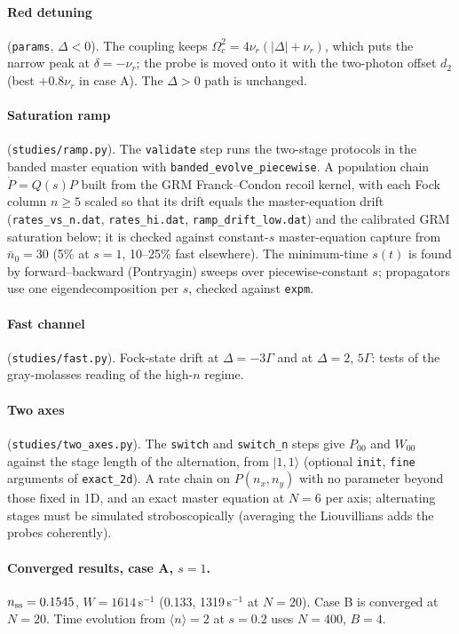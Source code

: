\documentclass[11pt,a4paper]{article}
\newcommand{\ket}[1]{|#1\rangle}
\newcommand{\code}[1]{\texttt{#1}}
\begin{document}
\paragraph{Red detuning} (\code{params}, $\Delta<0$). The coupling keeps $\Omega_c^2=4\nu_r(|\Delta|+\nu_r)$, which puts the narrow peak at $\delta=-\nu_r$; the probe is moved onto it with the two-photon offset $d_2$ (best $+0.8\nu_r$ in case A). The $\Delta>0$ path is unchanged.

\paragraph{Saturation ramp} (\code{studies/ramp.py}). The \code{validate} step runs the two-stage protocols in the banded master equation with \code{banded\_evolve\_piecewise}. A population chain $\dot P=Q(s)P$ built from the GRM Franck--Condon recoil kernel, with each Fock column $n\ge5$ scaled so that its drift equals the master-equation drift (\code{rates\_vs\_n.dat}, \code{rates\_hi.dat}, \code{ramp\_drift\_low.dat}) and the calibrated GRM saturation below; it is checked against constant-$s$ master-equation capture from $\bar n_0=30$ (5\% at $s=1$, 10--25\% fast elsewhere). The minimum-time $s(t)$ is found by forward--backward (Pontryagin) sweeps over piecewise-constant $s$; propagators use one eigendecomposition per $s$, checked against \code{expm}.

\paragraph{Fast channel} (\code{studies/fast.py}). Fock-state drift at $\Delta=-3\Gamma$ and at $\Delta=2$, $5\Gamma$: tests of the gray-molasses reading of the high-$n$ regime.

\paragraph{Two axes} (\code{studies/two\_axes.py}). The \code{switch} and \code{switch\_n} steps give $P_{00}$ and $W_{00}$ against the stage length of the alternation, from $\ket{1,1}$ (optional \code{init}, \code{fine} arguments of \code{exact\_2d}). A rate chain on $P(n_x,n_y)$ with no parameter beyond those fixed in 1D, and an exact master equation at $N=6$ per axis; alternating stages must be simulated stroboscopically (averaging the Liouvillians adds the probes coherently).

\paragraph{Converged results, case A, $s=1$.} $n_{\rm ss}=0.1545$, $W=1614$\,s$^{-1}$ (0.133, 1319\,s$^{-1}$ at $N=20$). Case B is converged at $N=20$. Time evolution from $\langle n\rangle=2$ at $s=0.2$ uses $N=400$, $B=4$.
\end{document}
